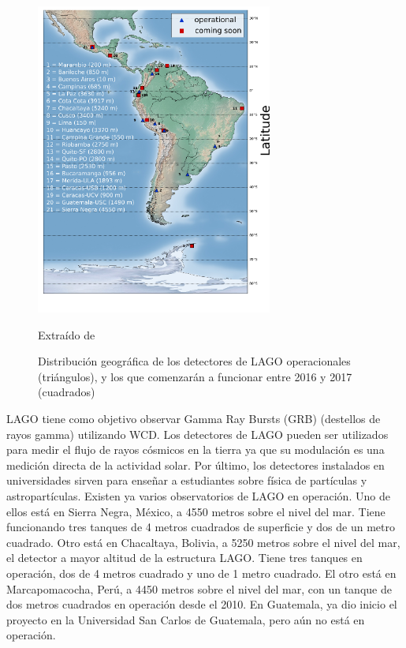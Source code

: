 \documentclass{book}
\begin{document}
\begin{figure}[ht] %
\begin{center}
 \includegraphics[width = 0.5\linewidth]{ASOREY2015.png}
 
 Extra\'ido de \citep{ASOREY2015}
\caption{Distribuci\'on geogr\'afica de los detectores de LAGO operacionales (tri\'angulos), y los que comenzar\'an a funcionar entre 2016 y 2017 (cuadrados)}
\end{center}
\end{figure}

LAGO tiene como objetivo observar Gamma Ray Bursts (GRB) (destellos de rayos gamma) utilizando WCD. Los detectores de LAGO pueden ser utilizados para medir el flujo de rayos c\'osmicos en la tierra ya que su modulaci\'on es una medici\'on directa de la actividad solar. Por \'ultimo, los detectores instalados en universidades sirven para ense\~nar a estudiantes sobre f\'isica de part\'iculas y astropart\'iculas. Existen ya varios observatorios de LAGO en operaci\'on. Uno de ellos est\'a en Sierra Negra, M\'exico, a 4550 metros sobre el nivel del mar. Tiene funcionando tres tanques de 4 metros cuadrados de superficie y dos de un metro cuadrado. Otro est\'a en Chacaltaya, Bolivia, a 5250 metros sobre el nivel del mar, el detector a mayor altitud de la estructura LAGO. Tiene tres tanques en operaci\'on, dos de 4 metros cuadrado y uno de 1 metro cuadrado. El otro est\'a en Marcapomacocha, Per\'u, a 4450 metros sobre el nivel del mar, con un tanque de dos metros cuadrados en operaci\'on desde el 2010. En Guatemala, ya dio inicio el proyecto en la Universidad San Carlos de Guatemala, pero a\'un no est\'a en operaci\'on. \citep{VILLASENOR}
\end{document}
